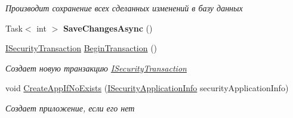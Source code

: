 \begin{DoxyCompactItemize}
\begin{DoxyCompactList}\small\item\em Производит сохранение всех сделанных изменений в базу данных \end{DoxyCompactList}\item 
\mbox{\label{interface_security_1_1_interfaces_1_1_i_security_factory_aa5611993ac7216131ceac9f21dae9ca9}} 
Task$<$ int $>$ {\bfseries Save\+Changes\+Async} ()
\item 
\hyperlink{interface_security_1_1_interfaces_1_1_i_security_transaction}{I\+Security\+Transaction} \hyperlink{interface_security_1_1_interfaces_1_1_i_security_factory_a7c6e1914da204e43cc140647f4c2b384}{Begin\+Transaction} ()
\begin{DoxyCompactList}\small\item\em Создает новую транзакцию \hyperlink{interface_security_1_1_interfaces_1_1_i_security_transaction}{I\+Security\+Transaction} \end{DoxyCompactList}\item 
void \hyperlink{interface_security_1_1_interfaces_1_1_i_security_factory_a4a9f62d7a54b60c31bb8243cccafa1c5}{Create\+App\+If\+No\+Exists} (\hyperlink{interface_security_1_1_interfaces_1_1_i_security_application_info}{I\+Security\+Application\+Info} security\+Application\+Info)
\begin{DoxyCompactList}\small\item\em Создает приложение, если его нет \end{DoxyCompactList}\end{DoxyCompactItemize}
